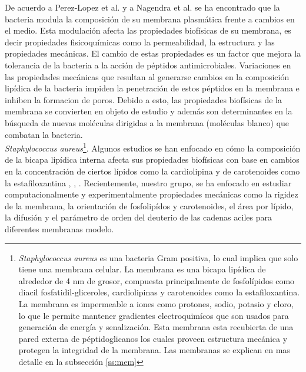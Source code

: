 De acuerdo a Perez-Lopez et al. \cite{Perez-Lopez2019VariationsProperties} y a Nagendra et al.  \cite{Nagendra2011} se ha encontrado que la bacteria modula la composici\'{o}n de su membrana plasm\'{a}tica frente a cambios en el medio. Esta modulaci\'{o}n afecta las propiedades biof\'{i}sicas de su membrana, es decir propiedades fisicoqu\'{i}micas como la permeabilidad, la estructura y las propiedades mec\'{a}nicas. El cambio de estas propiedades es un factor que mejora la tolerancia de la bacteria a la acci\'{o}n de p\'{e}ptidos antimicrobiales. Variaciones en las propiedades mec\'{a}nicas que resultan al generarse cambios en la composici\'{o}n lip\'{i}dica de la bacteria impiden la penetraci\'{o}n de estos p\'{e}ptidos en la membrana e inhiben la formacion de poros. Debido a esto, las propiedades biof\'{i}sicas de la membrana se convierten en objeto de estudio y adem\'{a}s son determinantes en la b\'{u}squeda de nuevas mol\'{e}culas dirigidas a la membrana (mol\'{e}culas blanco) que combatan la bacteria. \\

\textit{Staphylococcus aureus}\footnote{\textit{Staphylococcus aureus} es una bacteria Gram positiva, lo cual implica que solo tiene una membrana celular.  La membrana es una bicapa lip\'{i}dica de alrededor de 4 nm de grosor, compuesta principalmente de fosfol\'{i}pidos como diacil fosfatidil-gliceroles, cardiolipinas y carotenoides como la estafiloxantina. La membrana es impermeable a iones como protones, sodio, potasio y cloro, lo que le permite mantener gradientes electroquim\'{i}cos que son usados para generaci\'{o}n de energ\'{i}a y senalizaci\'{o}n. Esta membrana esta recubierta de una pared externa de p\'{e}ptidoglicanos los cuales proveen estructura mec\'{a}nica y protegen la integridad de la membrana. Las membranas se explican en mas detalle en la subsecci\'{o}n \ref{ss:mem}}. Algunos estudios se han enfocado en c\'{o}mo la composici\'{o}n de la bicapa lip\'{i}dica interna afecta sus propiedades biof\'{i}sicas con base en cambios en la concentraci\'{o}n de ciertos l\'{i}pidos como la cardiolipina \cite{Hernandez-Villa1BiophysicalPeptides} y de carotenoides como la estafiloxantina \cite{Melendez-Delgado2018StudyingBilayers}, \cite{Perez-Lopez2019VariationsProperties}, \cite{Nagendra2011}. Recientemente, nuestro grupo, se ha enfocado en estudiar computacionalmente y experimentalmente propiedades mec\'{a}nicas como la rigidez de la membrana, la orientaci\'{o}n de fosfolip\'{i}dos y carotenoides, el \'{a}rea por l\'{i}pido, la difusi\'{o}n y el par\'{a}metro de orden del deuterio de las cadenas aciles para diferentes membranas modelo.\\

